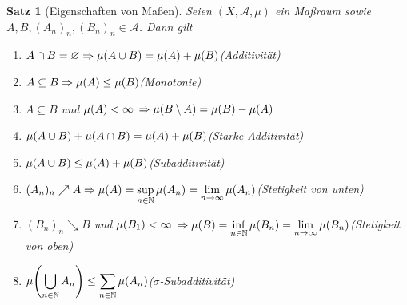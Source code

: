 \documentclass[11pt, twoside, a4paper]{article}
\theoremstyle{plain}
\newtheorem{satz}[blockelement]{Satz}
\numberwithin{equation}{subsection}
\newcommand{\pair}[1]{\left(#1\right)}
\newcommand{\of}[1]{\mathopen{}\mathclose{}\bgroup\left(#1\aftergroup\egroup\right)}
\newcommand{\impl}[0]{\Rightarrow{}}
\renewcommand{\emptyset}{\varnothing}
\newcommand{\toinf}{\to\infty}
\newcommand{\N}{\mathbb{N}}
\newcommand{\mA}{\mathcal{A}}
\begin{document}
    \begin{satz}[Eigenschaften von Maßen] %
        \label{satz:eigenschaften-mass}
        Seien $\pair{X, \mA, \mu}$ ein Maßraum sowie $A, B, (A_n)_n, \pair{B_n}_n \in\mA$. Dann gilt
        \begin{enumerate}[label=(\roman*)]
            \item $A \cap B = \emptyset \impl \mu\of{A \cup B} = \mu\of{A} + \mu\of{B}$\hfill (Additivität)
            \item $A \subseteq B \impl \mu\of{A} \leq \mu\of{B}$\hfill (Monotonie)
            \item $A \subseteq B$ und $\mu\of{A} < \infty$ $\impl \mu\of{B\setminus A} = \mu\of{B} - \mu\of{A}$
            \item $\mu\of{A\cup B} + \mu\of{A \cap B} = \mu\of{A} + \mu\of{B}$\hfill (Starke Additivität)
            \item $\mu\of{A \cup B} \leq \mu\of{A} + \mu\of{B}$\hfill (Subadditivität)
            \item $(A_n)_n\nearrow A \impl \displaystyle\mu\of{A} = \sup_{n\in\N} \mu\of{A_n} = \lim_{n\toinf} \mu\of{A_n}$\hfill (Stetigkeit von unten)
            \item $(B_n)_n\searrow B$ und $\mu\of{B_1} < \infty$ $\impl \displaystyle\mu\of{B} = \inf_{n\in\N} \mu\of{B_n} = \lim_{n\toinf} \mu\of{B_n}$\hfill (Stetigkeit von oben)
            \item $\displaystyle\mu\of{\bigcup_{n\in\N} A_n} \leq \sum_{n\in\N}^{} \mu\of{A_n}$\hfill ($\sigma$-Subadditivität)
        \end{enumerate}


\end{satz}
\end{document}
